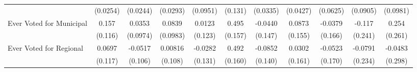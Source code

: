 {\begin{tabular}{l*{10}{c}}
            &    (0.0254)         &    (0.0244)         &    (0.0293)         &    (0.0951)         &     (0.131)         &    (0.0335)         &    (0.0427)         &    (0.0625)         &    (0.0905)         &    (0.0981)         \\
\addlinespace
Ever Voted for Municipal&       0.157         &      0.0353         &      0.0839         &      0.0123         &       0.495\sym{**} &     -0.0440         &      0.0873         &     -0.0379         &      -0.117         &       0.254         \\
            &     (0.116)         &    (0.0974)         &    (0.0983)         &     (0.123)         &     (0.157)         &     (0.147)         &     (0.155)         &     (0.166)         &     (0.241)         &     (0.261)         \\
\addlinespace
Ever Voted for Regional&      0.0697         &     -0.0517         &     0.00816         &     -0.0282         &       0.492\sym{**} &     -0.0852         &      0.0302         &     -0.0523         &     -0.0791         &     -0.0483         \\
            &     (0.117)         &     (0.106)         &     (0.108)         &     (0.131)         &     (0.160)         &     (0.140)         &     (0.161)         &     (0.170)         &     (0.234)         &     (0.298)         \\
\bottomrule
\end{tabular}
}
